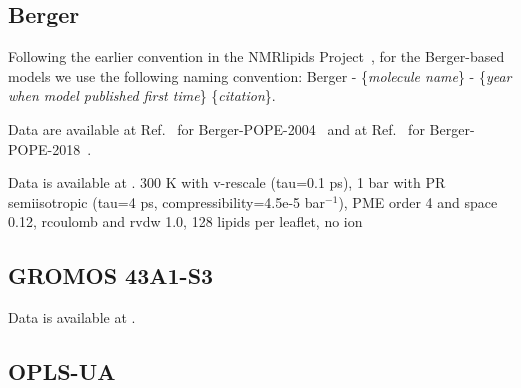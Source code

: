 \documentclass[journal=jpcbfk]{achemso}
\begin{document}

 


\subsection{Berger}

Following the earlier convention in the NMRlipids Project~\cite{botan15}, 
for the Berger-based models we use the following naming convention: 
Berger - \{{\it molecule name}\} - \{{\it year when model published first time}\} \{{\it citation}\}.

 Data are available at Ref.~ for Berger-POPE-2004~\cite{??} and at Ref.~ for Berger-POPE-2018~\cite{??}. 


 Data is available at \cite{POPCberger300K,POPC1POPE1berger}. 
300 K with v-rescale (tau=0.1 ps),
1 bar with PR semiisotropic (tau=4 ps, compressibility=4.5e-5 bar$^{-1}$),
PME order 4 and space 0.12,
rcoulomb and rvdw 1.0,
128 lipids per leaflet,
no ion 

\subsection{GROMOS 43A1-S3}

 Data is available at \cite{gromos43a1s3POPEfiles}. 

\subsection{OPLS-UA}
\end{document}
